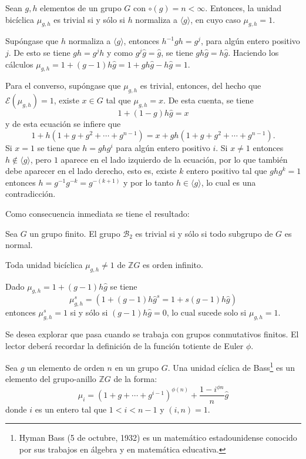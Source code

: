 \begin{proposicion}\label{prop:unidadesb}
Sean $g,h$ elementos de un grupo $G$ con $\circ(g) = n < \infty$. Entonces, la unidad bicíclica $\mu_{g,h}$ es trivial si y sólo si $h$ normaliza a $\langle g \rangle$, en cuyo caso $\mu_{g,h} = 1$.
\end{proposicion}
\begin{proof*}
Supóngase que $h$ normaliza a $\langle g \rangle$, entonces $h^{-1}gh = g^j$, para algún entero positivo $j$. De esto se tiene $gh = g^jh$ y como $g^j\hat{g} = \hat{g}$, se tiene $gh\hat{g} = h\hat{g}$. Haciendo los cálculos $\mu_{g,h} = 1+(g-1)h\hat{g}= 1+gh\hat{g}-h\hat{g} =1$.

Para el converso, supóngase que $\mu_{g,h}$ es trivial, entonces, del hecho que $\mathcal{E}(\mu_{g,h})=1$, existe $x \in G$ tal que $\mu_{g,h}=x$. De esta cuenta, se tiene
\[ 1+(1-g)h\hat{g} = x \] y de esta ecuación se infiere que \[ 1+ h(1+g+g^2+\cdots + g^{n-1}) = x +gh(1+g+g^2+\cdots+g^{n-1}).  \] Si $x=1$ se tiene que $h=ghg^i$ para algún entero positivo $i$. Si $x \neq 1$ entonces $h \notin \langle g \rangle$, pero $1$ aparece en el lado izquierdo de la ecuación, por lo que también debe aparecer en el lado derecho, esto es, existe $k$ entero positivo tal que $ghg^k = 1$ entonces $h = g^{-1}g^{-k}= g^{-(k+1)}$ y por lo tanto $h \in \langle g \rangle$, lo cual es una contradicción. 
\end{proof*}
Como consecuencia inmediata se tiene el resultado:
\begin{proposicion}
Sea $G$ un grupo finito. El grupo $\mathcal{B}_2$ es trivial si y sólo si todo subgrupo de $G$ es normal.
\end{proposicion}
\begin{proposicion}
Toda unidad bicíclica $\mu_{g,h} \neq 1$ de $\mathds{Z}G$ es orden infinito. 
\end{proposicion}
\begin{proof*}
Dado $\mu_{g,h} = 1 +(g-1)h\hat{g}$ se tiene
\[  \mu_{g,h}^s = (1+(g-1)h\hat{g}^s = 1+s(g-1)h\hat{g})  \] entonces $\mu_{g,h}^s = 1$ si y sólo si $(g-1)h\hat{g} = 0$, lo cual sucede solo si $\mu_{g,h} = 1$.
\end{proof*}
Se desea explorar que pasa cuando se trabaja con grupos conmutativos finitos. El lector deberá recordar la definición de la función totiente de Euler $\phi$. 
\begin{definicion}
Sea $g$ un elemento de orden $n$ en un grupo $G$. Una unidad cíclica \nopagebreak[0] de Bass\footnote{Hyman Bass (5 de octubre, 1932) es un matemático estadounidense conocido por sus trabajos en álgebra y en matemática educativa.  } es un elemento del grupo-anillo $\mathds{Z}G$ de la forma:
\[ \mu_{i} = (1+g+\cdots+g^{i-1})^{\phi(n)} + \frac{1-i^{\phi{n}}}{n}\hat{g}  \] donde $i$ es un entero tal que $1<i<n-1$ y $(i,n) = 1$.
\end{definicion}
